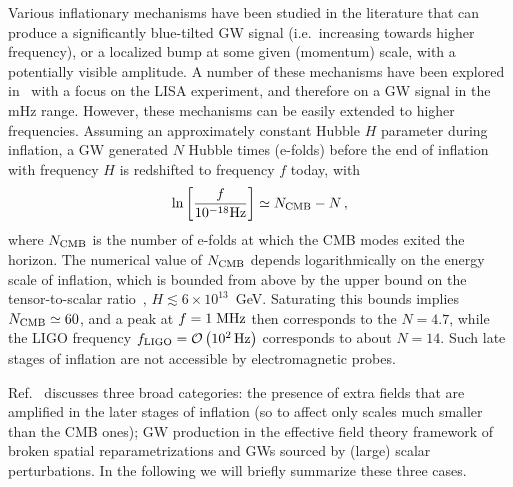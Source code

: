 \documentclass[11pt,a4paper]{article}
\begin{document}
Various inflationary mechanisms have been studied in the literature that can produce a significantly blue-tilted GW signal (i.e.\ increasing towards higher frequency), or a localized bump at some given (momentum) scale, with a potentially visible amplitude. A number of these mechanisms have been explored in~\cite{Bartolo:2016ami} with a focus on the LISA experiment, and therefore on a GW signal in the mHz range. However, these mechanisms can be easily extended to higher frequencies. Assuming an approximately constant Hubble $H$ parameter during inflation, a GW generated $N$ Hubble times (e-folds) before the end of inflation with frequency $H$ is redshifted to frequency $f$ today, with
%
\begin{equation}
\ln \left[\frac{f}{10^{-18} {\rm Hz}}\right] \simeq N_{\rm CMB}-N \,,
\label{eqfN}
\end{equation}
%
where $ N_{\rm CMB}$ is the number of e-folds at which the CMB modes exited the horizon. The numerical value of $N_{\rm CMB}$ depends logarithmically on the energy scale of inflation, which is bounded from above by the upper bound on the tensor-to-scalar ratio~\cite{Akrami:2018odb}, $H \lesssim 6 \times 10^{13}$~GeV. Saturating this bounds implies $N_{\rm CMB} \simeq 60$, and a peak at $f = 1 \; {\rm MHz}$ then corresponds to the $N = 4.7$, while the LIGO frequency $f_{\rm LIGO} = {\mathcal{O}} \left( 10^2 \, {\rm Hz} \right)$ corresponds to about $N = 14$. Such late stages of inflation are not accessible by electromagnetic probes.

Ref.~\cite{Bartolo:2016ami} discusses three broad categories: the presence of extra fields that are amplified in the later stages of inflation (so to affect only scales much smaller than the CMB ones); GW production in the effective field theory framework of broken spatial reparametrizations and GWs sourced by (large) scalar perturbations.
%
In the following we will briefly summarize these three cases.
\end{document}
